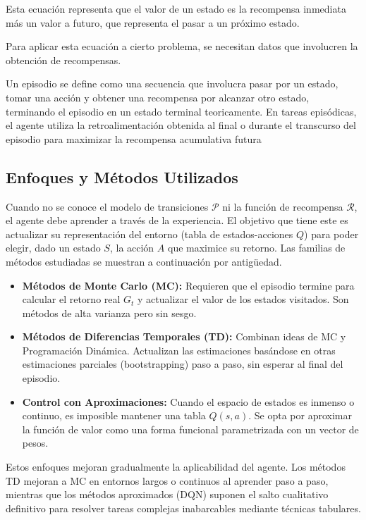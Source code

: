 Esta ecuación representa que el valor de un estado es la recompensa inmediata más un valor a futuro, que representa el pasar a un próximo estado.

Para aplicar esta ecuación a cierto problema, se necesitan datos que involucren la obtención de recompensas.
\begin{definition}[Episodio]
Un episodio se define como una secuencia que involucra pasar por un estado, tomar una acción y obtener una recompensa por alcanzar otro estado, terminando el episodio en un estado terminal teoricamente. En tareas episódicas, el agente utiliza la retroalimentación obtenida al final o durante el transcurso del episodio para maximizar la recompensa acumulativa futura
\end{definition}

\subsection{Enfoques y Métodos Utilizados}

Cuando no se conoce el modelo de transiciones $\mathcal{P}$ ni la función de recompensa $\mathcal{R}$, el agente debe aprender a través de la experiencia. El objetivo que tiene este es actualizar su representación del entorno (tabla de estados-acciones $Q$) para poder elegir, dado un estado $S$, la acción $A$ que maximice su retorno. Las familias de métodos estudiadas se muestran a continuación por antigüedad.

\begin{itemize}
    \item \textbf{Métodos de Monte Carlo (MC):} Requieren que el episodio termine para calcular el retorno real $G_t$ y actualizar el valor de los estados visitados. Son métodos de alta varianza pero sin sesgo.
    \item \textbf{Métodos de Diferencias Temporales (TD):} Combinan ideas de MC y Programación Dinámica. Actualizan las estimaciones basándose en otras estimaciones parciales (bootstrapping) paso a paso, sin esperar al final del episodio.
    \item \textbf{Control con Aproximaciones:} Cuando el espacio de estados es inmenso o continuo, es imposible mantener una tabla $Q(s,a)$. Se opta por aproximar la función de valor como una forma funcional parametrizada con un vector de pesos.
\end{itemize}

Estos enfoques mejoran gradualmente la aplicabilidad del agente. Los métodos TD mejoran a MC en entornos largos o continuos al aprender paso a paso, mientras que los métodos aproximados (DQN) suponen el salto cualitativo definitivo para resolver tareas complejas inabarcables mediante técnicas tabulares. 

